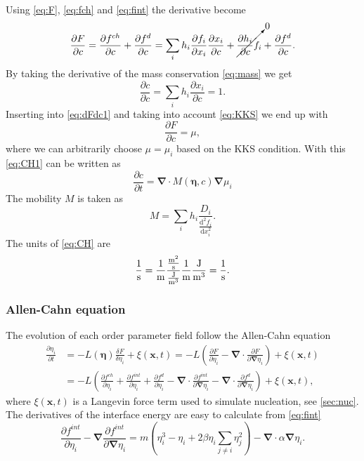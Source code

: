 \documentclass[12pt,a4paper]{article}
\newcommand{\vardiff}[2]{\frac{\delta#1}{\delta#2}}
\newcommand{\partdiff}[2]{\frac{\partial#1}{\partial#2}}
\providecommand{\secdiff}[2]{\frac{\mathrm{d}^2#1}{\mathrm{d}#2^2}}
\providecommand{\vbf}[1]{\boldsymbol{#1}}
\providecommand{\gradient}[0]{\vbf{\nabla}}
\begin{document}
Using \cref{eq:F}, \cref{eq:fch} and \cref{eq:fint} the derivative become
\begin{equation}
  \partdiff{F}{c}=\partdiff{f^{ch}}{c}+\partdiff{f^d}{c}=\sum_i h_i\partdiff{f_i}{x_i}\partdiff{x_i}{c}+\cancelto{0}{\partdiff{h_i}{c}f_i}+\partdiff{f^d}{c}.
  \label{eq:dFdc1}
\end{equation}
By taking the derivative of the mass conservation \cref{eq:mass} we get
\begin{equation}
  \partdiff{c}{c}=\sum_i h_i\partdiff{x_i}{c}=1.
\end{equation}
Inserting into \cref{eq:dFdc1} and taking into account \cref{eq:KKS} we end up with
\begin{equation}
  \partdiff{F}{c}=\mu,
\end{equation} 
where we can arbitrarily choose $\mu=\mu_i$ based on the KKS condition.\todo{This only works if $\partdiff{f_i^d}{x_i}=0$}
With this \cref{eq:CH1} can be written as
\begin{equation}
  \partdiff{c}{t}=\gradient\cdot M(\vbf{\eta},c)\gradient\mu_i
  \label{eq:CH}
\end{equation}
The mobility $M$ is taken as
\begin{equation}
  M = \sum_i h_i\frac{D_i}{\secdiff{f_i}{x_i}}.
\end{equation}
The units of \cref{eq:CH} are
\begin{equation}
\si[per-mode=fraction]{\per\second}=\si[per-mode=fraction]{\per\meter}\frac{\si[per-mode=fraction]{\square\meter\per\second}}{\si[per-mode=fraction]{\joule\per\cubic\meter}}\si[per-mode=fraction]{\per\meter}\si[per-mode=fraction]{\joule\per\cubic\meter}=\si[per-mode=fraction]{\per\second}.
\end{equation}


\subsubsection{Allen-Cahn equation}
The evolution of each order parameter field follow the Allen-Cahn equation
\begin{equation}
\begin{aligned}
  \partdiff{\eta_i}{t}&=-L(\vbf{\eta})\vardiff{F}{\eta_i}+\xi(\vbf{x},t)=-L\left(\partdiff{F}{\eta_i}-\gradient\cdot\partdiff{F}{\gradient\eta_i}\right)+\xi(\vbf{x},t)\\
  &=-L\left(\partdiff{f^{ch}}{\eta_i}+\partdiff{f^{int}}{\eta_i}+\partdiff{f^d}{\eta_i}-\gradient\cdot\partdiff{f^{int}}{\gradient\eta_i}-\gradient\cdot\partdiff{f^d}{\gradient\eta_i}\right)+\xi(\vbf{x},t),
\end{aligned}
\label{eq:AC1}
\end{equation}
where $\xi(\vbf{x},t)$ is a Langevin force term used to simulate nucleation, see \cref{sec:nuc}.
The derivatives of the interface energy are easy to calculate from \cref{eq:fint}
\begin{equation}
  \partdiff{f^{int}}{\eta_i}-\gradient\partdiff{f^{int}}{\gradient\eta_i}=m\left(\eta_i^3-\eta_i+2\beta\eta_i\sum_{j\ne i}\eta_j^2\right)-\gradient\cdot\alpha\gradient\eta_i.
\end{equation}
\end{document}
